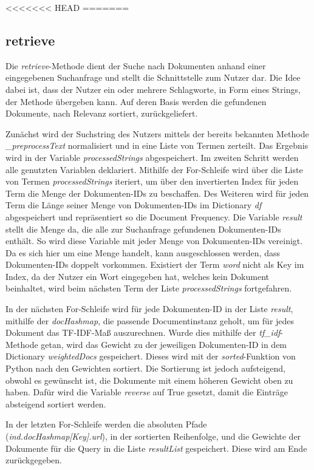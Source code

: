 <<<<<<< HEAD
=======
\subsection{retrieve}\label{retrieve}

Die \textit{retrieve}-Methode dient der Suche nach Dokumenten anhand einer eingegebenen Suchanfrage und stellt die Schnittstelle zum Nutzer dar. Die Idee dabei ist, dass der Nutzer ein oder mehrere Schlagworte, in Form eines Strings, der Methode übergeben kann. Auf deren Basis werden die gefundenen Dokumente, nach Relevanz sortiert, zurückgeliefert. 

Zunächst wird der Suchstring des Nutzers mittels der bereits bekannten Methode \textit{\_preprocessText} normalisiert und in eine Liste von Termen zerteilt. Das Ergebnis wird in der Variable \textit{processedStrings} abgespeichert. Im zweiten Schritt werden alle genutzten Variablen deklariert. Mithilfe der For-Schleife wird über die Liste von Termen \textit{processedStrings} iteriert, um über den invertierten Index für jeden Term die Menge der Dokumenten-IDs zu beschaffen. Des Weiteren wird für jeden Term die Länge seiner Menge von Dokumenten-IDs im Dictionary \textit{df} abgespeichert und repräsentiert so die Document Frequency. Die Variable \textit{result} stellt die Menge da, die alle zur Suchanfrage gefundenen Dokumenten-IDs enthält. So wird diese Variable mit jeder Menge von Dokumenten-IDs vereinigt. Da es sich hier um eine Menge handelt, kann ausgeschlossen werden, dass Dokumenten-IDs doppelt vorkommen. Existiert der Term \textit{word} nicht als Key im Index, da der Nutzer ein Wort eingegeben hat, welches kein Dokument beinhaltet, wird beim nächsten Term der Liste \emph{processedStrings} fortgefahren.

In der nächsten For-Schleife wird für jede Dokumenten-ID in der Liste \textit{result}, mithilfe der \textit{docHashmap}, die passende Documentinstanz geholt, um für jedes Dokument das TF-IDF-Maß auszurechnen. Wurde dies mithilfe der \textit{tf\_idf}-Methode getan, wird das Gewicht zu der jeweiligen Dokumenten-ID in dem Dictionary \textit{weightedDocs} gespeichert. Dieses wird mit der \textit{sorted}-Funktion von Python nach den Gewichten sortiert. Die Sortierung ist jedoch aufsteigend, obwohl es gewünscht  ist, die Dokumente mit einem höheren Gewicht oben zu haben. Dafür wird die Variable \textit{reverse} auf True gesetzt, damit die Einträge absteigend sortiert werden.

In der letzten For-Schleife werden die absoluten Pfade (\textit{ind.docHashmap[Key].url}), in der sortierten Reihenfolge, und die Gewichte der Dokumente für die Query in die Liste \textit{resultList} gespeichert. Diese wird am Ende zurückgegeben.


